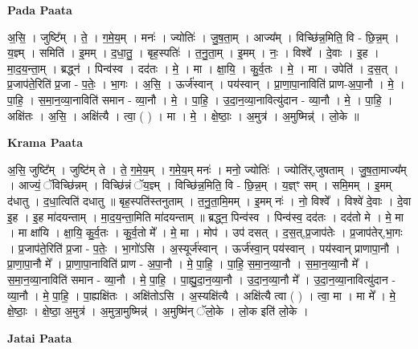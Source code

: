 \documentclass[17pt]{extarticle}
\begin{document}
\textbf{Pada Paata} \newline

अ॒सि॒ । जुष्टि᳚म् । ते॒ । ग॒मे॒य॒म् । मनः॑ । ज्योतिः॑ । जु॒ष॒ता॒म् । आज्य᳚म् । विच्छि॑न्न॒मिति॒ वि - छि॒न्न॒म् । य॒ज्ञ्म् । समिति॑ । इ॒मम् । द॒धा॒तु॒ । बृह॒स्पतिः॑ । त॒नु॒ता॒म् । इ॒मम् । नः॒ । विश्वे᳚ । दे॒वाः । इ॒ह । मा॒द॒य॒न्ता॒म् । ब्रद्ध्न॑ । पिन्व॑स्व । दद॑तः । मे॒ । मा । क्षा॒यि॒ । कु॒र्व॒तः । मे॒ । मा । उपेति॑ । द॒स॒त् । प्र॒जाप॑ते॒रिति॑ प्र॒जा - प॒तेः॒ । भा॒गः । अ॒सि॒ । ऊर्ज॑स्वान् । पय॑स्वान् । प्रा॒णा॒पा॒नाविति॑ प्राण-अ॒पा॒नौ । मे॒ । पा॒हि॒ । स॒मा॒न॒व्या॒नाविति॑ समान - व्या॒नौ । मे॒ । पा॒हि॒ । उ॒दा॒न॒व्या॒नावित्यु॑दान - व्या॒नौ । मे॒ । पा॒हि॒ । अक्षि॑तः । अ॒सि॒ । अक्षि॑त्यै । त्वा॒ ( ) । मा । मे॒ । क्षे॒ष्ठाः॒ । अ॒मुत्र॑ । अ॒मुष्मिन्न्॑ । लो॒के ॥  \newline


\textbf{Krama Paata} \newline

अ॒सि॒ जुष्टि᳚म् । जुष्टि॑म् ते । ते॒ ग॒मे॒य॒म् । ग॒मे॒य॒म् मनः॑ । मनो॒ ज्योतिः॑ । ज्योति॑र्,जुषताम् । जु॒ष॒ता॒माज्य᳚म् । आज्यं॒ ॅविच्छि॑न्नम् । विच्छि॑न्नं ॅय॒ज्ञ्म् । विच्छि॑न्न॒मिति॒ वि - छि॒न्न॒म् । य॒ज्ञ्ꣳ सम् । समि॒मम् । इ॒मम् द॑धातु । द॒धा॒त्विति॑ दधातु ॥ बृह॒स्पति॑स्तनुताम् । त॒नु॒ता॒मि॒मम् । इ॒मम् नः॑ । नो॒ विश्वे᳚ । विश्वे॑ दे॒वाः । दे॒वा इ॒ह । इ॒ह मा॑दयन्ताम् । मा॒द॒य॒न्ता॒मिति मा॑दयन्ताम् ॥ ब्रद्ध्न॒ पिन्व॑स्व । पिन्व॑स्व॒ दद॑तः । दद॑तो मे । मे॒ मा । मा क्षा॑यि । क्षा॒यि॒ कु॒र्व॒तः । कु॒र्व॒तो मे᳚ । मे॒ मा । मोप॑ । उप॑ दसत् । द॒स॒त्,प्र॒जाप॑तेः । प्र॒जाप॑तेर्,भा॒गः । प्र॒जाप॑ते॒रिति॑ प्र॒जा - प॒तेः॒ । भा॒गो॑ऽसि । अ॒स्यूर्ज॑स्वान् । ऊर्ज॑स्वा॒न् पय॑स्वान् । पय॑स्वान् प्राणापा॒नौ । प्रा॒णा॒पा॒नौ मे᳚ । प्रा॒णा॒पा॒नाविति॑ प्राण - अ॒पा॒नौ । मे॒ पा॒हि॒ । पा॒हि॒ स॒मा॒न॒व्या॒नौ । स॒मा॒न॒व्या॒नौ मे᳚ । स॒मा॒न॒व्या॒नाविति॑ समान - व्या॒नौ । मे॒ पा॒हि॒ । पा॒ह्यु॒दा॒न॒व्या॒नौ । उ॒दा॒न॒व्या॒नौ मे᳚ । उ॒दा॒न॒व्या॒नावित्यु॑दान - व्या॒नौ । मे॒ पा॒हि॒ । पा॒ह्यक्षि॑तः । अक्षि॑तोऽसि । अ॒स्यक्षि॑त्यै । अक्षि॑त्यै त्वा ( ) । त्वा॒ मा । मा मे᳚ । मे॒ क्षे॒ष्ठाः॒ । क्षे॒ष्ठा॒ अ॒मुत्र॑ । अ॒मुत्रा॒मुष्मिन्न्॑ । अ॒मुष्मि॑न् ॅलो॒के । लो॒क इति॑ लो॒के । \newline

\textbf{Jatai Paata} \newline
\end{document}
